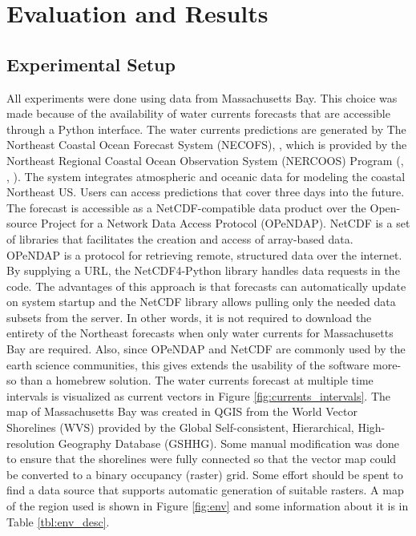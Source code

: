 \documentclass{tamuccthesis}
\begin{document}
\chapter{Evaluation and Results}

\section{Experimental Setup}

All experiments were done using data from Massachusetts Bay. This choice was made because of the availability of water currents forecasts that are accessible through a Python interface. The water currents predictions are generated by The Northeast Coastal Ocean Forecast System (NECOFS), \cite{NECOFS}, which is provided by the Northeast Regional Coastal Ocean Observation System (NERCOOS) Program (\cite{NERACOOS}, \cite{MFI}, \cite{MIT:sea}). The system integrates atmospheric and oceanic data for modeling the coastal Northeast US. Users can access predictions that cover three days into the future. The forecast is accessible as a NetCDF-compatible data product over the Open-source Project for a Network Data Access Protocol (OPeNDAP). NetCDF is a set of libraries that facilitates the creation and access of array-based data. OPeNDAP is a protocol for retrieving remote, structured data over the internet. By supplying a URL, the NetCDF4-Python library handles data requests in the code. The advantages of this approach is that forecasts can automatically update on system startup and the NetCDF library allows pulling only the needed data subsets from the server. In other words, it is not required to download the entirety of the Northeast forecasts when only water currents for Massachusetts Bay are required. Also, since OPeNDAP and NetCDF are commonly used by the earth science communities, this gives extends the usability of the software more-so than a homebrew solution. The water currents forecast at multiple time intervals is visualized as current vectors in Figure \ref{fig:currents_intervals}. The map of Massachusetts Bay was created in QGIS from the World Vector Shorelines (WVS) provided by the Global Self-consistent, Hierarchical, High-resolution Geography Database (GSHHG). Some manual modification was done to ensure that the shorelines were fully connected so that the vector map could be converted to a binary occupancy (raster) grid. Some effort should be spent to find a data source that supports automatic generation of suitable rasters. A map of the region used is shown in Figure \ref{fig:env} and some information about it is in Table \ref{tbl:env_desc}.
\end{document}
